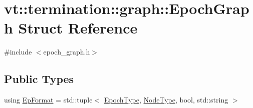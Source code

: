 \hypertarget{structvt_1_1termination_1_1graph_1_1_epoch_graph}{}\section{vt\+:\+:termination\+:\+:graph\+:\+:Epoch\+Graph Struct Reference}
\label{structvt_1_1termination_1_1graph_1_1_epoch_graph}


{\ttfamily \#include $<$epoch\+\_\+graph.\+h$>$}

\subsection*{Public Types}
\begin{DoxyCompactItemize}
\item 
using \hyperlink{structvt_1_1termination_1_1graph_1_1_epoch_graph_a127b9f54d98b9645451c2d9a2821d10e}{Ep\+Format} = std\+::tuple$<$ \hyperlink{namespacevt_a81d11b28122d43bf9834577e4a06440f}{Epoch\+Type}, \hyperlink{namespacevt_a866da9d0efc19c0a1ce79e9e492f47e2}{Node\+Type}, bool, std\+::string $>$
\end{DoxyCompactItemize}
